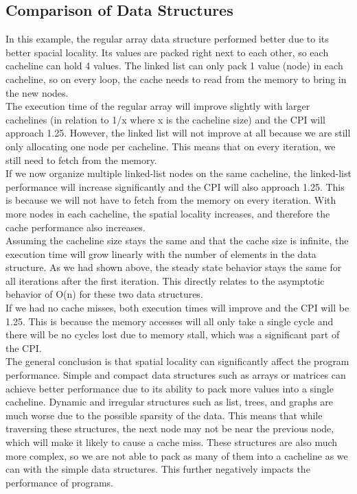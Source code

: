 \documentclass[10pt]{article}
\begin{document}
\subsection{Comparison of Data Structures}
In this example, the regular array data structure performed better due to its better spacial locality. Its values are packed right next to each other, so each cacheline can hold 4 values. The linked list can only pack 1 value (node) in each cacheline, so on every loop, the cache needs to read from the memory to bring in the new nodes. \\
The execution time of the regular array will improve slightly with larger cachelines (in relation to 1/x where x is the cacheline size) and the CPI will approach 1.25. However, the linked list will not improve at all because we are still only allocating one node per cacheline. This means that on every iteration, we still need to fetch from the memory. \\
If we now organize multiple linked-list nodes on the same cacheline, the linked-list performance will increase significantly and the CPI will also approach 1.25. This is because we will not have to fetch from the memory on every iteration. With more nodes in each cacheline, the spatial locality increases, and therefore the cache performance also increases. \\
Assuming the cacheline size stays the same and that the cache size is infinite, the execution time will grow linearly with the number of elements in the data structure. As we had shown above, the steady state behavior stays the same for all iterations after the first iteration. This directly relates to the asymptotic behavior of O(n) for these two data structures. \\
If we had no cache misses, both execution times will improve and the CPI will be 1.25. This is because the memory accesses will all only take a single cycle and there will be no cycles lost due to memory stall, which was a significant part of the CPI. \\
The general conclusion is that spatial locality can significantly affect the program performance. Simple and compact data structures such as arrays or matrices can achieve better performance due to its ability to pack more values into a single cacheline. Dynamic and irregular structures such as list, trees, and graphs are much worse due to the possible sparsity of the data. This means that while traversing these structures, the next node may not be near the previous node, which will make it likely to cause a cache miss. These structures are also much more complex, so we are not able to pack as many of them into a cacheline as we can with the simple data structures. This further negatively impacts the performance of programs. 
\end{document}
